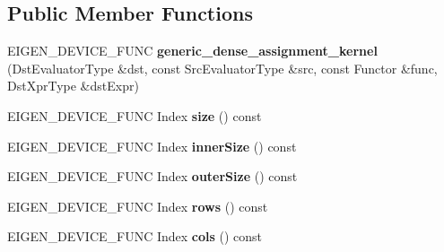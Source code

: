 \subsection*{Public Member Functions}
\begin{DoxyCompactItemize}
\item 
\mbox{\label{class_eigen_1_1internal_1_1generic__dense__assignment__kernel_a78626a9a6997a4e2402b2a4c2f841aa7}} 
E\+I\+G\+E\+N\+\_\+\+D\+E\+V\+I\+C\+E\+\_\+\+F\+U\+NC {\bfseries generic\+\_\+dense\+\_\+assignment\+\_\+kernel} (Dst\+Evaluator\+Type \&dst, const Src\+Evaluator\+Type \&src, const Functor \&func, Dst\+Xpr\+Type \&dst\+Expr)
\item 
\mbox{\label{class_eigen_1_1internal_1_1generic__dense__assignment__kernel_a82a9cc7d42ec2577722ed15a829b77bd}} 
E\+I\+G\+E\+N\+\_\+\+D\+E\+V\+I\+C\+E\+\_\+\+F\+U\+NC Index {\bfseries size} () const
\item 
\mbox{\label{class_eigen_1_1internal_1_1generic__dense__assignment__kernel_aca5b2865e530f046e184124034fc079d}} 
E\+I\+G\+E\+N\+\_\+\+D\+E\+V\+I\+C\+E\+\_\+\+F\+U\+NC Index {\bfseries inner\+Size} () const
\item 
\mbox{\label{class_eigen_1_1internal_1_1generic__dense__assignment__kernel_a5e3f6c72327428a8579436ad0eacaa56}} 
E\+I\+G\+E\+N\+\_\+\+D\+E\+V\+I\+C\+E\+\_\+\+F\+U\+NC Index {\bfseries outer\+Size} () const
\item 
\mbox{\label{class_eigen_1_1internal_1_1generic__dense__assignment__kernel_af2b7c2682462c20bc08a6e30f9215e4f}} 
E\+I\+G\+E\+N\+\_\+\+D\+E\+V\+I\+C\+E\+\_\+\+F\+U\+NC Index {\bfseries rows} () const
\item 
\mbox{\label{class_eigen_1_1internal_1_1generic__dense__assignment__kernel_ab407bdaab83a8c681a46a2ff497dbb7c}} 
E\+I\+G\+E\+N\+\_\+\+D\+E\+V\+I\+C\+E\+\_\+\+F\+U\+NC Index {\bfseries cols} () const
\item 
\mbox{\label{class_eigen_1_1internal_1_1generic__dense__assignment__kernel_a2a0cb3fa49658df28db49b4ad6bca05d}} 

\end{DoxyCompactItemize}
